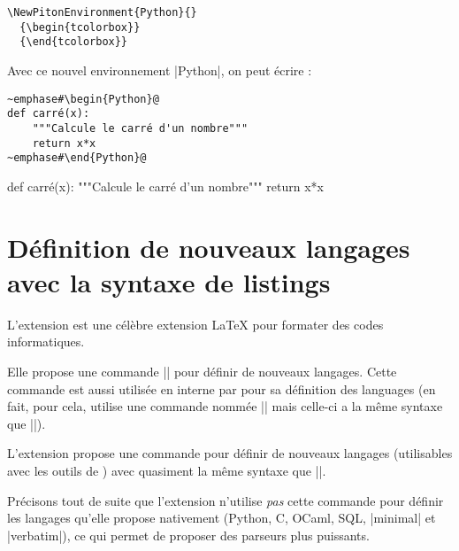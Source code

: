 \documentclass[dvipsnames,svgnames]{article}
\begin{document}
\begin{Verbatim}
\NewPitonEnvironment{Python}{}
  {\begin{tcolorbox}}
  {\end{tcolorbox}}
\end{Verbatim}

\bigskip
Avec ce nouvel environnement |{Python}|, on peut écrire : 

\begin{Verbatim}
~emphase#\begin{Python}@
def carré(x):
    """Calcule le carré d'un nombre"""
    return x*x
~emphase#\end{Python}@
\end{Verbatim}

  {\begin{tcolorbox}}
  {\end{tcolorbox}}

\begin{Python}
def carré(x):
    """Calcule le carré d'un nombre"""
    return x*x
\end{Python}

\section{Définition de nouveaux langages avec la syntaxe de listings}

\label{NewPitonLanguage}

\medskip
L'extension  est une célèbre extension LaTeX pour formater des codes informatiques.  

\medskip
Elle propose une commande |\lstdefinelanguage| pour définir de nouveaux langages. Cette
commande est aussi utilisée en interne par  pour sa définition des languages
(en fait, pour cela,  utilise une commande nommée |\lst@definelanguage| mais
celle-ci a la même syntaxe que |\lstdefinelanguage|).

\medskip
L'extension  propose une commande  pour
définir de nouveaux langages (utilisables avec les outils de ) avec quasiment
la même syntaxe que |\lstdefinelanguage|.

\medskip
Précisons tout de suite que l'extension  n'utilise \emph{pas} cette commande
pour définir les langages qu'elle propose nativement (Python, C, OCaml, SQL, |minimal| et
|verbatim|), ce qui permet de proposer des parseurs plus puissants. 
\end{document}
